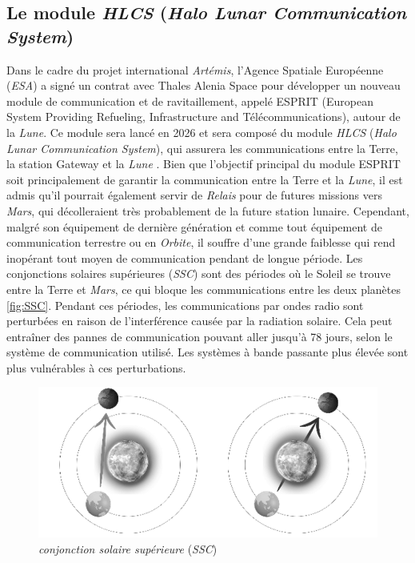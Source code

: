 \documentclass[conference]{IEEEtran}
\begin{document}
\subsection{Le module \emph{HLCS} (\emph{Halo Lunar Communication System})}
\label{sec:HLCS}
Dans le cadre du projet international \emph{Artémis}, l'Agence Spatiale Européenne (\emph{ESA}) a signé un contrat avec Thales Alenia Space pour développer un nouveau module de communication et de ravitaillement, appelé ESPRIT (European System Providing Refueling, Infrastructure and Télécommunications), autour de la \emph{Lune}. Ce module sera lancé en 2026 et sera composé du module \emph{HLCS} (\emph{Halo Lunar Communication System}), qui assurera les communications entre la Terre, la station Gateway et la \emph{Lune} \cite{b9}.
Bien que l'objectif principal du module ESPRIT soit principalement de garantir la communication entre la Terre et la \emph{Lune}, il est admis qu'il pourrait également servir de \emph{Relais} pour de futures missions vers \emph{Mars}, qui décolleraient très probablement de la future station lunaire.
Cependant, malgré son équipement de dernière génération et comme tout équipement de communication terrestre ou en \emph{Orbite}, il souffre d'une grande faiblesse qui rend inopérant tout moyen de communication pendant de longue période. Les conjonctions solaires supérieures (\emph{SSC}) sont des périodes où le Soleil se trouve entre la Terre et \emph{Mars}, ce qui bloque les communications entre les deux planètes \autoref{fig:SSC}. Pendant ces périodes, les communications par ondes radio sont perturbées en raison de l'interférence causée par la radiation solaire. Cela peut entraîner des pannes de communication pouvant aller jusqu'à 78 jours, selon le système de communication utilisé. Les systèmes à bande passante plus élevée sont plus vulnérables à ces perturbations.

\begin{figure}[htbp]
\centerline{\includegraphics[scale=1.18]{Image3.png}}
\caption{\emph{conjonction solaire supérieure} (\emph{SSC}) \cite{b9}}
\label{fig:SSC}
\end{figure}
\end{document}
